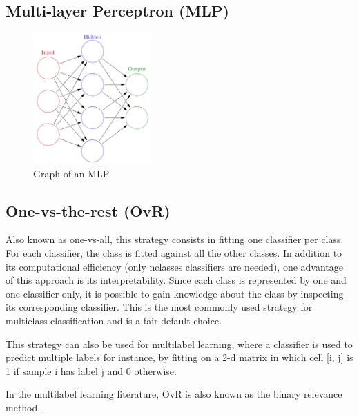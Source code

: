 \documentclass[12pt]{article}
\numberwithin{equation}{section}
\numberwithin{table}{section}
\numberwithin{figure}{section}
\begin{document}
\subsection{Multi-layer Perceptron (MLP)} \label{mlp}

\begin{figure}[H] \centering
	\includegraphics[width=0.4\textwidth]{mlp.png}
	\caption{Graph of an MLP }
	\label{mlpg}
\end{figure}




\subsection{One-vs-the-rest (OvR) } \label{ovr}

Also known as one-vs-all, this strategy consists in fitting one classifier per class. For each classifier, the class is fitted against all the other classes. In addition to its computational efficiency (only nclasses classifiers are needed), one advantage of this approach is its interpretability. Since each class is represented by one and one classifier only, it is possible to gain knowledge about the class by inspecting its corresponding classifier. This is the most commonly used strategy for multiclass classification and is a fair default choice.

This strategy can also be used for multilabel learning, where a classifier is used to predict multiple labels for instance, by fitting on a 2-d matrix in which cell [i, j] is 1 if sample i has label j and 0 otherwise.

In the multilabel learning literature, OvR is also known as the binary relevance method.

\end{document}
